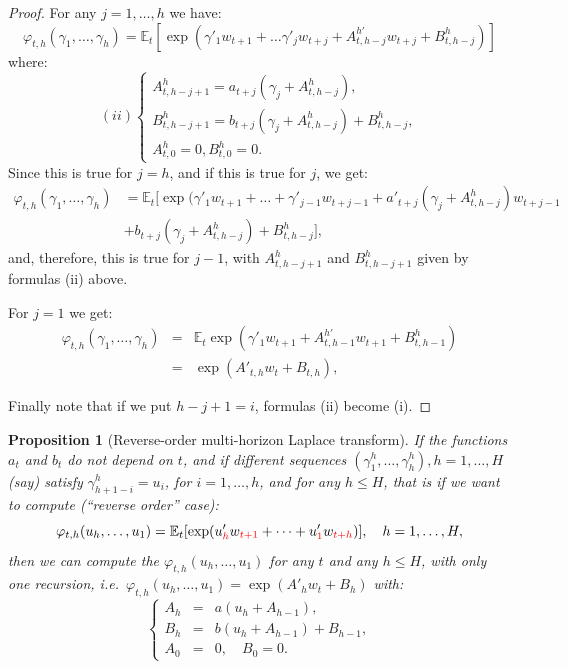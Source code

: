 \documentclass[
  12pt,
]{book}
\newtheorem{proposition}{Proposition}[chapter]
\theoremstyle{definition}
\theoremstyle{definition}
\theoremstyle{definition}
\theoremstyle{definition}
\theoremstyle{remark}
\begin{document}
\begin{proof}
For any \(j=1,\dots,h\) we have:
\[
\varphi_{t,h}(\gamma_1,\dots,\gamma_h) = \mathbb{E}_t[\exp(\gamma'_1 w_{t+1}+\dots\gamma'_j w_{t+j}+A^{h'}_{t,h-j}w_{t+j}+B^h_{t,h-j})]
\]
where:
\[
(ii) \left\{
\begin{array}{l}
A^h_{t,h-j+1} = a_{t+j}(\gamma_{j} + A^h_{t,h-j}), \\
B^h_{t,h-j+1} = b_{t+j}(\gamma_{j} + A^h_{t,h-j}) + B^h_{t,h-j}, \\
A^h_{t,0} = 0, B^h_{t,0} = 0.
\end{array}
\right.
\]
Since this is true for \(j=h\), and if this is true for \(j\), we get:
\[
\begin{array}{ll}
\varphi_{t,h}(\gamma_1,\dots,\gamma_h) & = \mathbb{E}_t [\exp(\gamma'_1 w_{t+1}+\dots+\gamma'_{j-1}w_{t+j-1}+a'_{t+j}(\gamma_j+A^h_{t,h-j})w_{t+j-1} \\
& + b_{t+j}(\gamma_j+A^h_{t,h-j})+B^h_{t,h-j}],
\end{array}
\]
and, therefore, this is true for \(j-1\), with \(A^h_{t,h-j+1}\) and \(B^h_{t,h-j+1}\) given by formulas (ii) above.

For \(j=1\) we get:
\begin{eqnarray*}
\varphi_{t,h}(\gamma_1,\dots,\gamma_h) &=& \mathbb{E}_t \exp(\gamma'_1 w_{t+1}+A^{h'}_{t,h-1}w_{t+1}+B^h_{t,h-1}) \\
&=& \exp(A'_{t,h} w_t+B_{t,h}),
\end{eqnarray*}

Finally note that if we put \(h-j+1 = i\), formulas (ii) become (i).
\end{proof}

\begin{proposition}[Reverse-order multi-horizon Laplace transform]
\protect\hypertarget{prp:reverseMLT}{}\label{prp:reverseMLT}If the functions \(a_{t}\) and \(b_{t}\) do not depend on \(t\), and if different sequences \((\gamma^h_1,\dots,\gamma^h_h), h=1,\dots,H\) (say) satisfy \(\gamma^h_{h+1-i} = u_i\), for
\(i=1,\dots,h\), and for any \(h \leq H\), that is if we want to compute (``reverse order'' case):
\[
\varphi_{t,h}(u_h,\dots,u_1)=\mathbb{E}_t[\exp(u'_{\color{red}{h}} w_{\color{red}{t+1}}+\dots+u'_{\color{red}{1}} w_{\color{red}{t+h}})],
\quad h=1,\dots,H,
\]
then we can compute the \(\varphi_{t,h}(u_h,\dots,u_1)\) for any \(t\) and any \(h \leq H\), with only one recursion, i.e.~\(\varphi_{t,h}(u_h,\dots,u_1)=\exp(A'_hw_t+B_h)\) with:
\begin{equation}
\left\{
\begin{array}{ccl}
A_{h} &=& a(u_{h} + A_{h-1}), \\
B_{h} &=& b(u_{h} + A_{h-1}) + B_{h-1}, \\
A_{0} &=& 0,\quad  B_{0} = 0.
\end{array}
\right.\label{eq:auxLemmareverseMLT}
\end{equation}
\end{proposition}
\end{document}
